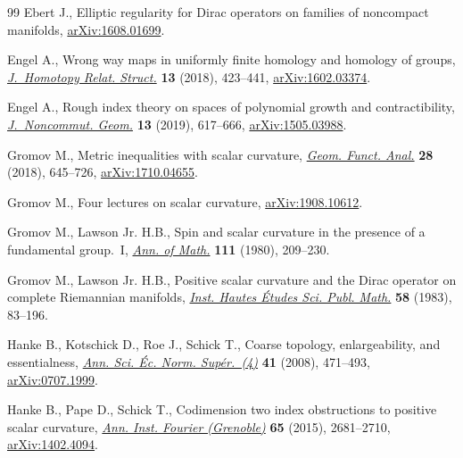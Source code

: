 \documentclass[pdftex]{sigma}
\numberwithin{equation}{section}
\begin{document}
\begin{thebibliography}{99}
Ebert J., Elliptic regularity for {D}irac operators on families of noncompact
 manifolds, \href{https://arxiv.org/abs/1608.01699}{arXiv:1608.01699}.

Engel A., Wrong way maps in uniformly finite homology and homology of groups,
 \href{https://doi.org/10.1007/s40062-017-0187-x}{\textit{J.~Homotopy Relat. Struct.}} \textbf{13} (2018), 423--441,
 \href{https://arxiv.org/abs/1602.03374}{arXiv:1602.03374}.

Engel A., Rough index theory on spaces of polynomial growth and
 contractibility, \href{https://doi.org/10.4171/JNCG/335}{\textit{J.~Noncommut. Geom.}} \textbf{13} (2019), 617--666,
 \href{https://arxiv.org/abs/1505.03988}{arXiv:1505.03988}.

Gromov M., Metric inequalities with scalar curvature, \href{https://doi.org/10.1007/s00039-018-0453-z}{\textit{Geom. Funct.
 Anal.}} \textbf{28} (2018), 645--726, \href{https://arxiv.org/abs/1710.04655}{arXiv:1710.04655}.

Gromov M., Four lectures on scalar curvature, \href{https://arxiv.org/abs/1908.10612}{arXiv:1908.10612}.

Gromov M., Lawson Jr. H.B., Spin and scalar curvature in the presence of a
 fundamental group.~{I}, \href{https://doi.org/10.2307/1971198}{\textit{Ann. of Math.}} \textbf{111} (1980), 209--230.

Gromov M., Lawson Jr. H.B., Positive scalar curvature and the {D}irac operator
 on complete {R}iemannian manifolds, \href{https://doi.org/10.1007/BF02953774}{\textit{Inst. Hautes \'Etudes Sci. Publ.
 Math.}} \textbf{58} (1983), 83--196.

Hanke B., Kotschick D., Roe J., Schick T., Coarse topology, enlargeability, and
 essentialness, \href{https://doi.org/10.24033/asens.2073}{\textit{Ann. Sci. \'Ec. Norm. Sup\'er.~(4)}} \textbf{41}
 (2008), 471--493, \href{https://arxiv.org/abs/0707.1999}{arXiv:0707.1999}.

Hanke B., Pape D., Schick T., Codimension two index obstructions to positive
 scalar curvature, \href{https://doi.org/10.5802/aif.3000}{\textit{Ann. Inst. Fourier (Grenoble)}} \textbf{65} (2015),
 2681--2710, \href{https://arxiv.org/abs/1402.4094}{arXiv:1402.4094}.


\end{thebibliography}
\end{document}
